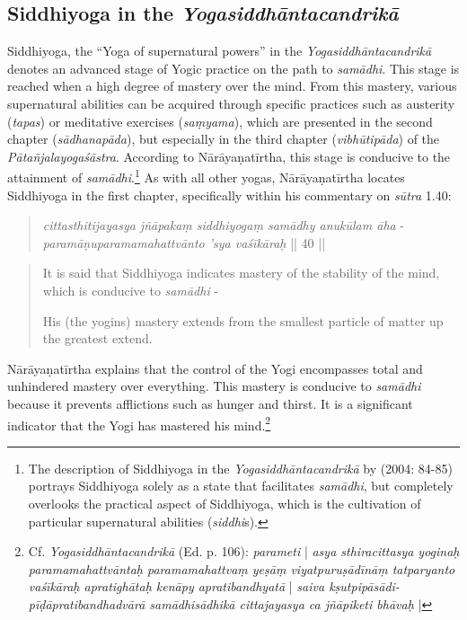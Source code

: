 \subsection{Siddhiyoga in the \textit{Yogasiddhāntacandrikā}}

Siddhiyoga, the ``Yoga of supernatural powers'' in the \textit{Yogasiddhāntacandrikā} denotes an advanced stage of Yogic practice on the path to \textit{samādhi}. This stage is reached when a high degree of mastery over the mind. From this mastery, various supernatural abilities can be acquired through specific practices such as austerity (\textit{tapas}) or meditative exercises (\textit{saṃyama}), which are presented in the second chapter (\textit{sādhanapāda}), but especially in the third chapter (\textit{vibhūtipāda}) of the \textit{Pātañjalayogaśāstra}. According to Nārāyaṇatīrtha, this stage is conducive to the attainment of \textit{samādhi}.\footnote{The description of Siddhiyoga in the \textit{Yogasiddhāntacandrikā} by \citeauthor{penna2004} (2004: 84-85) portrays Siddhiyoga solely as a state that facilitates \textit{samādhi}, but completely overlooks the practical aspect of Siddhiyoga, which is the cultivation of particular supernatural abilities (\textit{siddhi}s).}
As with all other yogas, Nārāyaṇatīrtha locates Siddhiyoga in the first chapter, specifically within his commentary on \textit{sūtra} 1.40:

\begin{quote}
  \textit{cittasthitijayasya jñāpakaṃ siddhiyogaṃ samādhy anukūlam āha} -\\
\textit{paramāṇuparamamahattvānto 'sya vaśīkāraḥ} || 40 ||
\end{quote}
\begin{quote}
It is said that Siddhiyoga indicates mastery of the stability of the mind, which is conducive to \textit{samādhi} -

His (the yogins) mastery extends from the smallest particle of matter up the greatest extend. \end{quote}

Nārāyaṇatīrtha explains that the control of the Yogi encompasses total and unhindered mastery over everything. This mastery is conducive to \textit{samādhi} because it prevents afflictions such as hunger and thirst. It is a significant indicator that the Yogi has mastered his mind.\footnote{Cf. \textit{Yogasiddhāntacandrikā} (Ed. p. 106): \textit{parameti} | \textit{asya sthiracittasya yoginaḥ paramamahattvāntaḥ paramamahattvaṃ yeṣāṃ viyatpuruṣādīnāṃ tatparyanto vaśīkāraḥ apratighātaḥ kenāpy apratibandhyatā} | \textit{saiva kṣutpipāsādi- pīḍāpratibandhadvārā samādhisādhikā cittajayasya ca jñāpiketi bhāvaḥ} |}

